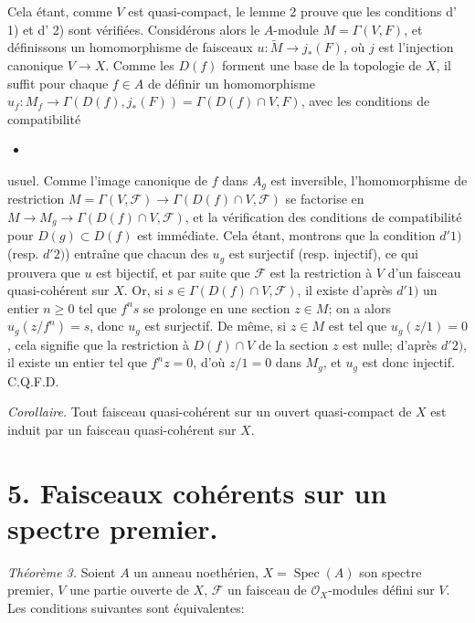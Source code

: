 Cela étant, comme $V$ est quasi-compact, le lemme 2 prouve que les conditions d' 1) et d' 2) sont vérifiées. Considérons alors le $A$-module $M = \Gamma(V,F)$, et définissons un homomorphisme de faisceaux $u: \tilde{M} \to j_*(F)$, où $j$ est l'injection canonique $V \to X$. Comme les $D(f)$ forment une base de la topologie de $X$, il suffit pour chaque $f \in A$ de définir un homomorphisme $u_f: M_f \to \Gamma(D(f), j_*(F)) = \Gamma(D(f) \cap V, F)$, avec les conditions de compatibilité

\newpage


\begin{itemize}
\item[-- 16 --]
\end{itemize}

usuel. Comme l'image canonique de $f$ dans $A_g$ est inversible, l'homomorphisme de restriction $M = \Gamma(V, \mathcal{F}) \to \Gamma(D(f) \cap V, \mathcal{F})$ se factorise en $M \to M_g \to \Gamma(D(f) \cap V, \mathcal{F})$, et la vérification des conditions de compatibilité pour $D(g) \subset D(f)$ est immédiate. Cela étant, montrons que la condition $d'1)$ (resp. $d'2)$) entraîne que chacun des $u_g$ est surjectif (resp. injectif), ce qui prouvera que $u$ est bijectif, et par suite que $\mathcal{F}$ est la restriction à $V$ d'un faisceau quasi-cohérent sur $X$. Or, si $s \in \Gamma(D(f) \cap V, \mathcal{F})$, il existe d'après $d'1)$ un entier $n \ge 0$ tel que $f^n s$ se prolonge en une section $z \in M$; on a alors $u_g(z/f^n) = s$, donc $u_g$ est surjectif. De même, si $z \in M$ est tel que $u_g(z/1) = 0$, cela signifie que la restriction à $D(f) \cap V$ de la section $z$ est nulle; d'après $d'2)$, il existe un entier tel que $f^n z = 0$, d'où $z/1 = 0$ dans $M_g$, et $u_g$ est donc injectif. C.Q.F.D.

\textit{Corollaire.} Tout faisceau quasi-cohérent sur un ouvert quasi-compact de $X$ est induit par un faisceau quasi-cohérent sur $X$.

\section*{5. Faisceaux cohérents sur un spectre premier.}

\textit{Théorème 3.} Soient $A$ un anneau noethérien, $X = \operatorname{Spec}(A)$ son spectre premier, $V$ une partie ouverte de $X$, $\mathcal{F}$ un faisceau de $\mathcal{O}_X$-modules défini sur $V$. Les conditions suivantes sont équivalentes:

